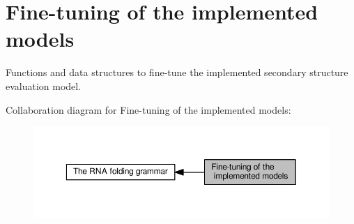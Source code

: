 \hypertarget{group__model__details}{}\section{Fine-\/tuning of the implemented models}
\label{group__model__details}


Functions and data structures to fine-\/tune the implemented secondary structure evaluation model.  


Collaboration diagram for Fine-\/tuning of the implemented models\+:
\nopagebreak
\begin{figure}[H]
\begin{center}
\leavevmode
\includegraphics[width=350pt]{group__model__details}
\end{center}
\end{figure}
